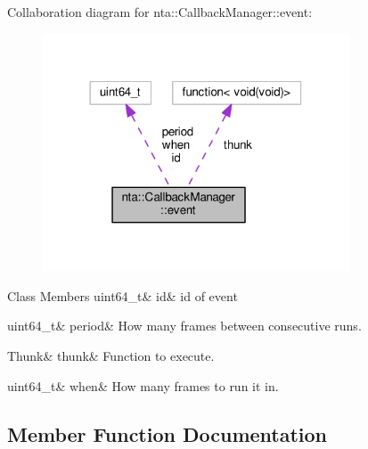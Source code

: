 Collaboration diagram for nta\+:\+:Callback\+Manager\+:\+:event\+:\nopagebreak
\begin{figure}[H]
\begin{center}
\leavevmode
\includegraphics[width=258pt]{da/d01/structnta_1_1CallbackManager_1_1event__coll__graph}
\end{center}
\end{figure}
\begin{DoxyFields}{Class Members}
\mbox{\label{classnta_1_1CallbackManager_a743978e02001b9ceff1145c41214d2e5}} 
uint64\_t&
id&
id of event \\
\hline

\mbox{\label{classnta_1_1CallbackManager_a15dd99ac7d4588c5ac5518c063431ef5}} 
uint64\_t&
period&
How many frames between consecutive runs. \\
\hline

\mbox{\label{classnta_1_1CallbackManager_ad92bce3b5cee6411a2b2c08b4c13b767}} 
Thunk&
thunk&
Function to execute. \\
\hline

\mbox{\label{classnta_1_1CallbackManager_ab20a0382304629ebdc2643a834c9dcff}} 
uint64\_t&
when&
How many frames to run it in. \\
\hline

\end{DoxyFields}


\subsection{Member Function Documentation}
\mbox{\label{classnta_1_1CallbackManager_a7912dc908d7a7a44267ddd8fa6fb8686}} 
